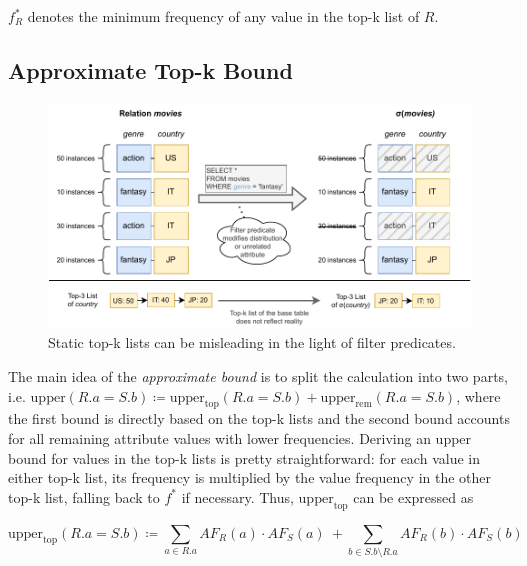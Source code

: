 $f^\ast_R$ denotes the minimum frequency of any value in the top-k list of $R$. 

\subsection{Approximate Top-k Bound}
\label{sec:tighter-bounds-approximate}

\begin{figure}[tb]
	\centering
	\includegraphics[width=\linewidth]{figures/topk-filters.pdf}
	\caption{Static top-k lists can be misleading in the light of filter predicates.}
	\label{fig:topk-filter-mismatch}
\end{figure}

The main idea of the \emph{approximate bound} is to split the calculation into two parts, i.e. $\text{upper}(R.a = S.b) \coloneqq \text{upper}_\text{top}(R.a = S.b) + \text{upper}_\text{rem}(R.a = S.b)$, where the first bound is directly based on the top-k lists and the second bound accounts for all remaining attribute values with lower frequencies. 
Deriving an upper bound for values in the top-k lists is pretty straightforward: for each value in either top-k list, its frequency is multiplied by the value frequency in the other top-k list, falling back to $f^\ast$ if necessary. 
Thus, $\text{upper}_\text{top}$ can be expressed as

\begin{definition}
    \begin{equation}
        \text{upper}_\text{top}(R.a = S.b) \coloneqq \sum_{a \in R.a} AF_R(a) \cdot AF_S(a)\:+\sum_{b \in S.b \setminus R.a} AF_R(b) \cdot AF_S(b)
    \end{equation}
    \label{def:approx-bound-topk}
\end{definition}



